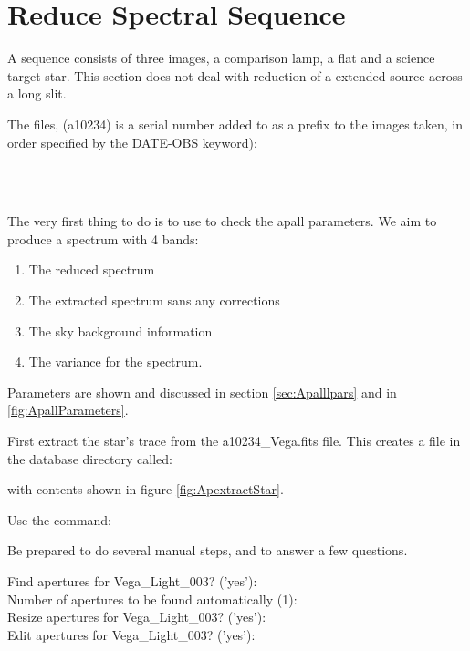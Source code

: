 \section{Reduce Spectral Sequence}

A sequence consists of three images, a comparison lamp, a flat and a science target star.
This section does not deal with reduction of a extended source across a long slit.

The files, (a10234) is a serial number added to as a prefix to the images
taken, in order specified by the DATE-OBS keyword):

    \\
    \\

The very first thing to do is to use  to check the
apall parameters. We aim to produce a spectrum with 4 bands:
\vspace{-.15cm}
\begin{enumerate}\addtolength{\itemsep}{-0.5\baselineskip}
   \item  The reduced spectrum
   \item  The extracted spectrum sans any corrections
   \item  The sky background information
   \item  The variance for the spectrum.
\end{enumerate}

Parameters are shown and discussed in section \ref{sec:Apalllpars} and in
\ref{fig:ApallParameters}.


First extract the star's trace from the a10234\_Vega.fits file. This creates
a file in the database directory called:


with contents shown in figure \ref{fig:ApextractStar}.

Use the command:


Be prepared to do several manual steps, and to answer a few questions.


Find apertures for Vega_Light_003? ('yes'):  \\
Number of apertures to be found automatically (1):  \\
Resize apertures for Vega_Light_003? ('yes'):  \\
Edit apertures for Vega_Light_003? ('yes'):  \\

